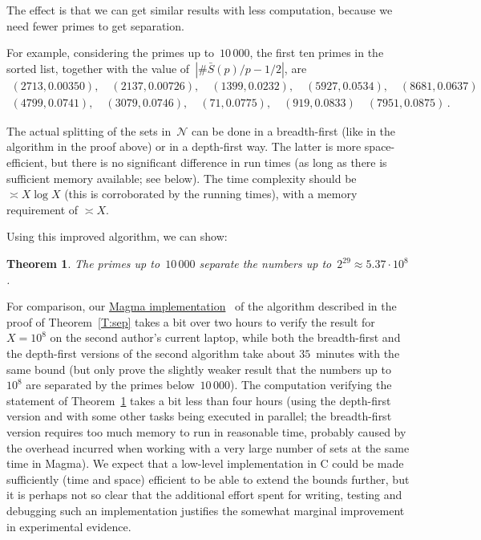 \documentclass[12pt,a4paper]{amsart}
\newcommand{\CN}{{\mathcal N}}
\newtheorem{Theorem}{Theorem}[section]
\theoremstyle{definition}
\numberwithin{equation}{section}
\begin{document}
The effect is that we can get similar results with less computation, because
we need fewer primes to get separation.

For example, considering the primes up to~$10\,000$, the first ten primes in the
sorted list, together with the value of~$|\#\bar{S}(p)/p - 1/2|$, are
\begin{gather*}
  (2713, 0.00350), \quad (2137, 0.00726), \quad (1399, 0.0232), \quad
  (5927, 0.0534), \quad (8681, 0.0637) \\
  (4799, 0.0741), \quad (3079, 0.0746), \quad (71, 0.0775), \quad
  (919, 0.0833) \quad (7951, 0.0875) \,.
\end{gather*}

The actual splitting of the sets in~$\CN$ can be done in a breadth-first (like in
the algorithm in the proof above) or in a depth-first way. The latter is
more space-efficient, but there is no significant difference in run times
(as long as there is sufficient memory available; see below). The time
complexity should be $\asymp X \log X$ (this is corroborated by the running times),
with a memory requirement of $\asymp X$.

Using this improved algorithm, we can show:

\begin{Theorem} \label{T:2_29}
  The primes up to~$10\,000$ separate the numbers up to~$2^{29} \approx 5.37 \cdot 10^8$.
\end{Theorem}

For comparison, our
\href{https://www.mathe2.uni-bayreuth.de/stoll/magma/Penkov_question.magma}{Magma implementation}~\cite{Code}
of the algorithm described in the proof of Theorem~\ref{T:sep} takes a bit over two hours
to verify the result for $X = 10^8$ on the second author's current laptop,
while both the breadth-first and the depth-first versions of the second algorithm
take about $35$~minutes with the same bound
(but only prove the slightly weaker result that the numbers up to~$10^8$ are
separated by the primes below~$10\,000$). The computation verifying the statement
of Theorem~\ref{T:2_29} takes a bit less than four hours (using the depth-first version
and with some other tasks being executed in parallel; the breadth-first
version requires too much memory to run in reasonable time, probably caused by
the overhead incurred when working with a very large number of sets at the same time in Magma).
We expect that a low-level implementation in C could be made sufficiently (time and space)
efficient to be able to extend the bounds further, but it is perhaps not so clear
that the additional effort spent for writing, testing and debugging such an implementation
justifies the somewhat marginal improvement in experimental evidence.
\end{document}
